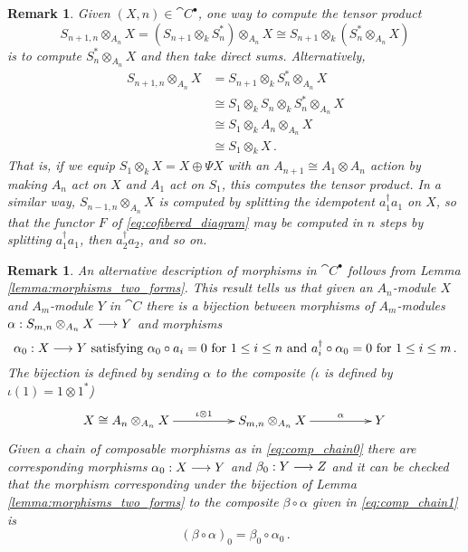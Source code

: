 \documentclass[english,letter paper,12pt,leqno]{article}
\theoremstyle{example}
\newtheorem{remark}[theorem]{Remark}
\numberwithin{equation}{section}
\begin{document}
\begin{remark}\label{remark:tensor_in_steps} Given $(X,n) \in \cat{C}^\bullet$, one way to compute the tensor product
\[
S_{n+1,n} \otimes_{A_n} X = (S_{n+1} \otimes_k S_n^*) \otimes_{A_n} X \cong S_{n+1} \otimes_k ( S_n^* \otimes_{A_n} X )
\]
is to compute $S_n^* \otimes_{A_n} X$ and then take direct sums. Alternatively,
\begin{align*}
S_{n+1,n} \otimes_{A_n} X &= S_{n+1} \otimes_k S_n^* \otimes_{A_n} X\\
&\cong S_1 \otimes_k S_n \otimes_k S_n^* \otimes_{A_n} X \\
&\cong S_1 \otimes_k A_n \otimes_{A_n} X \\
&\cong S_1 \otimes_k X\,.
\end{align*}
That is, if we equip $S_1 \otimes_k X = X \oplus \Psi X$ with an $A_{n+1} \cong A_1 \otimes A_n$ action by making $A_n$ act on $X$ and $A_1$ act on $S_1$, this computes the tensor product. In a similar way, $S_{n-1,n} \otimes_{A_n} X$ is computed by splitting the idempotent $a_1^\dagger a_1$ on $X$, so that the functor $F$ of \eqref{eq:cofibered_diagram} may be computed in $n$ steps by splitting $a_1^\dagger a_1$, then $a_2^\dagger a_2$, and so on.
\end{remark}

\begin{remark} An alternative description of morphisms in $\cat{C}^\bullet$ follows from Lemma \ref{lemma:morphisms_two_forms}. This result tells us that given an $A_n$-module $X$ and $A_m$-module $Y$ in $\cat{C}$ there is a bijection between morphisms of $A_m$-modules $\alpha: S_{m,n} \otimes_{A_n} X \longrightarrow Y$ and morphisms
\[
\alpha_0: X \longrightarrow Y \text{ satisfying } \alpha_0 \circ a_i = 0 \text{ for } 1 \le i \le n \text{ and } a_i^\dagger \circ \alpha_0 = 0 \text{ for } 1 \le i \le m\,.
\]
The bijection is defined by sending $\alpha$ to the composite ($\iota$ is defined by $\iota(1) = 1 \otimes 1^*$)
\[
\xymatrix@C+2pc{
X \cong A_n \otimes_{A_n} X \ar[r]^-{\iota \otimes 1} & S_{m,n} \otimes_{A_n} X \ar[r]^-{\alpha} & Y
}\,
\]
Given a chain of composable morphisms as in \eqref{eq:comp_chain0} there are corresponding morphisms $\alpha_0: X \longrightarrow Y$ and $\beta_0: Y \longrightarrow Z$ and it can be checked that the morphism corresponding under the bijection of Lemma \ref{lemma:morphisms_two_forms} to the composite $\beta \circ \alpha$ given in \eqref{eq:comp_chain1} is
\[
(\beta \circ \alpha)_0 = \beta_0 \circ \alpha_0\,.
\]
\end{remark}
\end{document}
